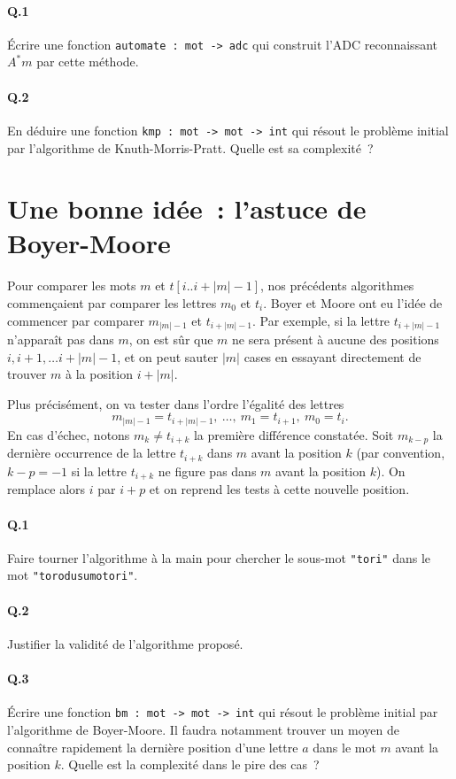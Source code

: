 \documentclass[10pt,a4paper]{article}
\begin{document}
\paragraph{Q.1} Écrire une fonction \texttt{automate : mot -> adc} qui construit 
l'ADC reconnaissant $A^* m$ par cette méthode.
\paragraph{Q.2} En déduire une fonction \texttt{kmp : mot -> mot -> int} qui 
résout le problème initial par l'algorithme de Knuth-Morris-Pratt. Quelle est 
sa complexité~?

\section{Une bonne idée~: l'astuce de Boyer-Moore} 
Pour comparer les mots $m$ et $t[i..i+|m|-1]$, nos précédents 
algorithmes commençaient par comparer les lettres $m_0$ et $t_i$. Boyer et 
Moore ont eu l'idée de commencer par comparer $m_{|m|-1}$ et $t_{i+|m|-1}$. Par 
exemple, si la lettre $t_{i+|m|-1}$ n'apparaît pas dans $m$, on est sûr que $m$ 
ne sera présent à aucune des positions $i, i+1, \dots i+|m|-1$, et on peut sauter
$|m|$ cases en essayant directement de trouver $m$ à la position $i+|m|$.

Plus précisément, on va tester dans l'ordre l'égalité des lettres
\[m_{|m|-1} = t_{i+|m|-1}, \ \dots, \ m_1 = t_{i+1}, \ m_0 = t_i.\]
En cas d'échec, notons $m_k \neq t_{i+k}$ la première différence constatée. Soit 
$m_{k-p}$ la dernière occurrence de la lettre $t_{i+k}$ dans $m$ avant la 
position $k$ (par convention, $k-p=-1$ si la lettre $t_{i+k}$ ne figure pas dans
$m$ avant la position $k$). On remplace alors $i$ par $i+p$ et on reprend les 
tests à cette nouvelle position.
\paragraph{Q.1} Faire tourner l'algorithme à la main pour chercher le sous-mot 
\texttt{"tori"} dans le mot \texttt{"torodusumotori"}.
\paragraph{Q.2} Justifier la validité de l'algorithme proposé.
\paragraph{Q.3} Écrire une fonction \texttt{bm : mot -> mot -> int} qui résout
le problème initial par l'algorithme de Boyer-Moore. Il faudra notamment trouver 
un moyen de connaître rapidement la dernière position d'une lettre $a$ dans le 
mot $m$ avant la position $k$. Quelle est la complexité dans le pire des cas~?
\end{document}
